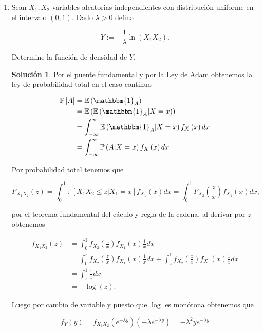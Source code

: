 \documentclass[letterpaper]{article}
\theoremstyle{definition}
\theoremstyle{lemathm}
\theoremstyle{lemathm}
\newtheorem{sol}{Solución}
\theoremstyle{lemathm}
\theoremstyle{lemademthm}
\newcommand{\pars}[1]{\left( #1 \right) }
\newcommand{\bracs}[1]{\left[ #1 \right] }
\newcommand{\PP}{\mathbb{P}}
\newcommand{\EE}{\mathbb{E}}
\newcommand{\1}{\mathbbm{1}}
\begin{document}
\begin{enumerate}
\begin{enumerate}
		\end{enumerate}

		\item Sean $X_1,X_2$ variables aleatorias independientes con distribución uniforme en el intervalo $(0,1)$. Dado $\lambda >0$ defina
		
		\[Y:=-\frac{1}{\lambda}\ln(X_1X_2).\]

		Determine la función de densidad de $Y$.

		\begin{sol}

			Por el puente fundamental y por la Ley de Adam obtenemos la ley de probabilidad total en el caso continuo

			\begin{align*}
				\PP\bracs{A} &= \EE\pars{\1_{A}}\\
				&= \EE\pars{\EE\pars{\1_{A}|X=x}}\\
				&= \int_{-\infty}^{\infty} \EE\pars{\1_{A}|X=x} f_X\pars{x}dx\\
				&= \int_{-\infty}^{\infty} \PP\pars{A|X=x} f_X\pars{x}dx
			\end{align*}

			Por probabilidad total tenemos que

			\[F_{X_1X_2}\pars{z} = \int_{0}^{1} \PP\bracs{X_1X_2 \leq z | X_1 = x} f_{X_1}\pars{x}dx = \int_{0}^{1} F_{X_2}\pars{\frac{z}{x}} f_{X_1}\pars{x}dx,\]

			por el teorema fundamental del cáculo y regla de la cadena, al derivar por $z$ obtenemos

			\begin{align*}
				f_{X_1X_2}\pars{z} &= \int_{0}^{1} f_{X_2}\pars{\frac{z}{x}} f_{X_1}\pars{x} \frac{1}{x} dx\\
				&= \int_{0}^{z} f_{X_2}\pars{\frac{z}{x}} f_{X_1}\pars{x} \frac{1}{x} dx + \int_{z}^{1} f_{X_2}\pars{\frac{z}{x}} f_{X_1}\pars{x} \frac{1}{x} dx\\
				&= \int_{z}^{1} \frac{1}{x} dx\\
				&= -\log\pars{z}.
			\end{align*}

			Luego por cambio de variable y puesto que $\log$ es monótona obtenemos que

			\[f_Y\pars{y} = f_{X_1X_2}\pars{e^{-\lambda y}}\pars{-\lambda e^{-\lambda y}} = -\lambda^2 ye^{-\lambda y}\]
			
		\end{sol}
	\end{enumerate}
\end{document}
